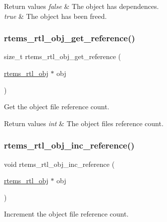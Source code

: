 \begin{DoxyRetVals}{Return values}
{\em false} & The object has dependences. \\
\hline
{\em true} & The object has been freed. \\
\hline
\end{DoxyRetVals}
\mbox{\label{rtl-obj_8c_a1e3d355bd13971d7bc629cb890b261bf}} 
\subsubsection{\texorpdfstring{rtems\_rtl\_obj\_get\_reference()}{rtems\_rtl\_obj\_get\_reference()}}
{\footnotesize\ttfamily size\+\_\+t rtems\+\_\+rtl\+\_\+obj\+\_\+get\+\_\+reference (\begin{DoxyParamCaption}\item[{\mbox{\hyperlink{structrtems__rtl__obj}{rtems\+\_\+rtl\+\_\+obj}} $\ast$}]{obj }\end{DoxyParamCaption})}

Get the object file reference count.


\begin{DoxyRetVals}{Return values}
{\em int} & The object file\textquotesingle{}s reference count. \\
\hline
\end{DoxyRetVals}
\mbox{\label{rtl-obj_8c_a86116ffbe87cb58f2428e6c66e4db58e}} 
\subsubsection{\texorpdfstring{rtems\_rtl\_obj\_inc\_reference()}{rtems\_rtl\_obj\_inc\_reference()}}
{\footnotesize\ttfamily void rtems\+\_\+rtl\+\_\+obj\+\_\+inc\+\_\+reference (\begin{DoxyParamCaption}\item[{\mbox{\hyperlink{structrtems__rtl__obj}{rtems\+\_\+rtl\+\_\+obj}} $\ast$}]{obj }\end{DoxyParamCaption})}

Increment the object file reference count.


